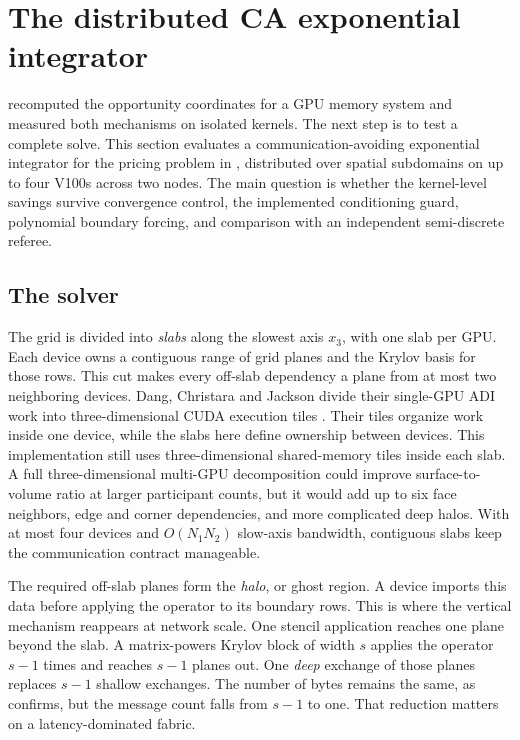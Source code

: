 \section{The distributed CA exponential integrator}\label{sec:integrator}

 recomputed the opportunity coordinates for a GPU memory system and measured both mechanisms on isolated kernels. The next step is to test a complete solve. This section evaluates a communication-avoiding exponential integrator for the pricing problem in , distributed over spatial subdomains on up to four V100s across two nodes. The main question is whether the kernel-level savings survive convergence control, the implemented conditioning guard, polynomial boundary forcing, and comparison with an independent semi-discrete referee.

\subsection{The solver}\label{sec:integrator-solver}

The grid is divided into \emph{slabs} along the slowest axis $x_3$, with one slab per GPU. Each device owns a contiguous range of grid planes and the Krylov basis for those rows. This cut makes every off-slab dependency a plane from at most two neighboring devices. Dang, Christara and Jackson divide their single-GPU ADI work into three-dimensional CUDA execution tiles \cite{dang-christara-jackson-2010}. Their tiles organize work inside one device, while the slabs here define ownership between devices. This implementation still uses three-dimensional shared-memory tiles inside each slab. A full three-dimensional multi-GPU decomposition could improve surface-to-volume ratio at larger participant counts, but it would add up to six face neighbors, edge and corner dependencies, and more complicated deep halos. With at most four devices and $O(N_1N_2)$ slow-axis bandwidth, contiguous slabs keep the communication contract manageable.

The required off-slab planes form the \emph{halo}, or ghost region. A device imports this data before applying the operator to its boundary rows. This is where the vertical mechanism reappears at network scale. One stencil application reaches one plane beyond the slab. A matrix-powers Krylov block of width $s$ applies the operator $s-1$ times and reaches $s-1$ planes out. One \emph{deep} exchange of those planes replaces $s-1$ shallow exchanges. The number of bytes remains the same, as  confirms, but the message count falls from $s-1$ to one. That reduction matters on a latency-dominated fabric.


